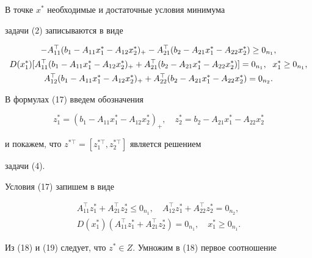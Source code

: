 \begin{pf}


В точке $x^*$ необходимые и достаточные условия минимума


задачи (2) записываются в виде


\begin{gather}


-A^\top_{11}(b_1-A_{11}x^*_1-A_{12}x^*_2)_+-


A^\top_{21}(b_2-A_{21}x^*_1-A_{22}x^*_2)\ge0_{n_1},\notag\\


D(x^*_1)[A^\top_{11}(b_1-A_{11}x^*_1-A_{12}x^*_2)_++


A^\top_{21}(b_2-A_{21}x^*_1-A_{22}x^*_2)]=0_{n_1},


\ \; x^*_1\ge0_{n_1},\\


A^\top_{12}(b_1-A_{11}x^*_1-A_{12}x^*_2)_++


A^\top_{22}(b_2-A_{21}x^*_1-A_{22}x^*_2)=0_{n_2}.\notag


\end{gather}





В формулах (17) введем обозначения


\begin{equation}


z^*_1=(b_1-A_{11}x^*_1-A_{12}x^*_2)_+,\quad


z^*_2=b_2-A_{21}x^*_1-A_{22}x^*_2


\end{equation}


и покажем, что $z^{*\top}=[z^{*\top}_1,z^{*\top}_2]$ является решением 


задачи (4).


Условия (17) запишем в виде


\begin{gather}


A^\top_{11}z^*_1+A^\top_{21}z^*_2\le0_{n_1},\quad


A^\top_{12}z^*_1+A^\top_{22}z^*_2=0_{n_2},\\


D(x^*_1)(A^\top_{11}z^*_1+A^\top_{21}z^*_2)=0_{n_1},\quad


x^*_1\ge0_{n_1}.


\end{gather}





Из (18) и (19) следует, что $z^*\in Z$. Умножим в (18) первое соотношение 



\end{pf}
